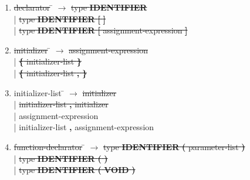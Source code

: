 \begin{enumerate}
\item \begin{tabbing} \sout{declarator} \= $\rightarrow$ \= \sout{type \textbf{IDENTIFIER}} \\
	\> \hspace*{0.05cm} | \> \sout{type \textbf{IDENTIFIER} \textbf{[} \textbf{]}} \\
	\> \hspace*{0.05cm} | \> \sout{type \textbf{IDENTIFIER} \textbf{[} assignment-expression \textbf{]}}\\
\end{tabbing}

\item \begin{tabbing} \sout{initializer} \= $\rightarrow$ \= \sout{assignment-expression} \\
	\> \hspace*{0.05cm} | \> \sout{\textbf{\{} initializer-list \textbf{\}}} \\
	\> \hspace*{0.05cm} | \> \sout{\textbf{\{} initializer-list \textbf{,} \textbf{\}}} \\
\end{tabbing}

\item \begin{tabbing} initializer-list \= $\rightarrow$ \= \sout{initializer} \\
	\> \hspace*{0.05cm} | \> \sout{initializer-list \textbf{,} initializer} \\
	\> \hspace*{0.05cm} | \> assignment-expression \\
	\> \hspace*{0.05cm} | \> initializer-list \textbf{,} assignment-expression \\
\end{tabbing}

\item \begin{tabbing} \sout{function-declarator} \= $\rightarrow$ \= \sout{type \textbf{IDENTIFIER} \textbf{(} parameter-list \textbf{)}} \\
	\> \hspace*{0.05cm} | \> \sout{type \textbf{IDENTIFIER} \textbf{(} \textbf{)} } \\
	\> \hspace*{0.05cm} | \> \sout{type \textbf{IDENTIFIER} \textbf{(} \textbf{VOID} \textbf{)}} \\
\end{tabbing}


\end{enumerate}
